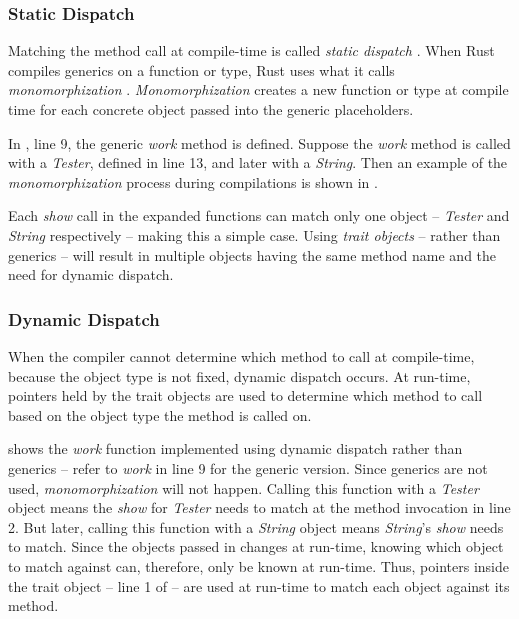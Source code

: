 \subsubsection{Static Dispatch}
Matching the method call at compile-time is called \textit{static dispatch} \cite{klabnik_2019_01, alexandrescu_01_01, abadi_12_01}.
When Rust compiles generics on a function or type, Rust uses what it calls \textit{monomorphization} \cite{klabnik_2019_01}.
\textit{Monomorphization} creates a new function or type at compile time for each concrete object passed into the generic placeholders.

In , line 9, the generic \textit{work} method is defined.
Suppose the \textit{work} method is called with a \textit{Tester}, defined in line 13, and later with a \textit{String}.
Then an example of the \textit{monomorphization} process during compilations is shown in .


Each \textit{show} call in the expanded functions can match only one object -- \textit{Tester} and \textit{String} respectively -- making this a simple case.
Using \textit{trait objects} -- rather than generics -- will result in multiple objects having the same method name and the need for dynamic dispatch.

\subsubsection{Dynamic Dispatch}
When the compiler cannot determine which method to call at compile-time, because the object type is not fixed, dynamic dispatch \cite{alexandrescu_01_01, klabnik_2019_01, abadi_12_01} occurs.
At run-time, pointers held by the trait objects are used to determine which method to call \cite{klabnik_2019_01} based on the object type the method is called on.

 shows the \textit{work} function implemented using dynamic dispatch rather than generics -- refer to \textit{work} in  line 9 for the generic version.
Since generics are not used, \textit{monomorphization} will not happen.
Calling this function with a \textit{Tester} object means the \textit{show} for \textit{Tester} needs to match at the method invocation in line 2.
But later, calling this function with a \textit{String} object means \textit{String}'s \textit{show} needs to match.
Since the objects passed in changes at run-time, knowing which object to match against can, therefore, only be known at run-time.
Thus, pointers inside the  trait object -- line 1 of  -- are used at run-time to match each object against its method.

